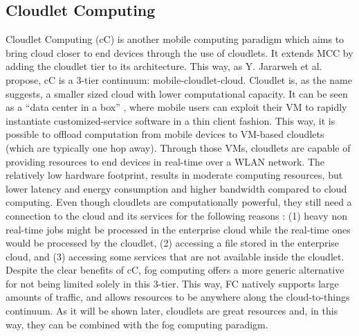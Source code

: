 \subsection{Cloudlet Computing}
Cloudlet Computing (cC) is another mobile computing paradigm which aims to bring cloud closer to end devices through the use of cloudlets. It extends MCC by adding the cloudlet tier to its architecture. This way, as  Y. Jararweh et al. \cite{jararweh2013resource} propose, cC is a 3-tier continuum: mobile-cloudlet-cloud. 
Cloudlet is, as the name suggests, a smaller sized cloud with lower computational capacity. It can be seen as a ``data center in a box'' \cite{satyanarayanan2009case}, where mobile users can exploit their VM to rapidly instantiate customized-service software in a thin client fashion. This way, it is possible to offload computation from mobile devices to VM-based cloudlets (which are typically one hop away). Through those VMs, cloudlets are capable of providing resources to end devices in real-time over a WLAN network. The relatively low hardware footprint, results in moderate computing resources, but lower latency and energy consumption and higher bandwidth compared to cloud computing. 
Even though cloudlets are computationally powerful, they still need a connection to the cloud and its services for the following reasons \cite{jararweh2013resource}: (1) heavy non real-time jobs might be processed in the enterprise cloud while the real-time ones would be processed by the cloudlet, (2) accessing a file stored in the enterprise cloud, and (3) accessing some services that are not available inside the cloudlet. Despite the clear benefits of cC, fog computing offers a more generic alternative for not being limited solely in this 3-tier. This way, FC natively supports large amounts of traffic, and allows resources to be anywhere along the cloud-to-things continuum. As it will be shown later, cloudlets are great resources and, in this way, they can be combined with the fog computing paradigm.

